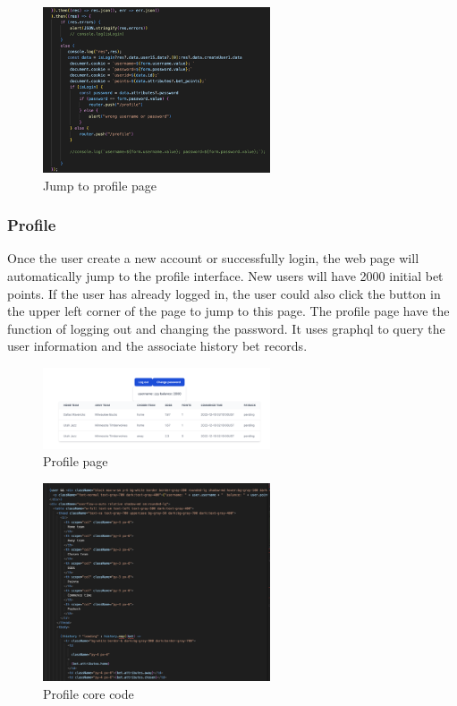 \documentclass[singlecolumn]{article}
\begin{document}
\begin{figure}[H]
    \centering
    \includegraphics[width=0.6\textwidth]{sign_code2.png}
    \caption{Jump to profile page}
\end{figure}

\subsubsection{Profile}
Once the user create a new account or successfully login, the web page will automatically jump to the profile interface. New users will have 2000 initial bet points. If the user has already logged in, the user could also click the button in the upper left corner of the page to jump to this page. The profile page have the function of logging out and changing the password. It uses graphql to query the user information and the associate history bet records.

\begin{figure}[H]
    \centering
    \includegraphics[width=0.6\textwidth]{profile.png}
    \caption{Profile page}
\end{figure}

\begin{figure}[H]
    \centering
    \includegraphics[width=0.6\textwidth]{profile_code.png}
    \caption{Profile core code}
\end{figure}
\end{document}

